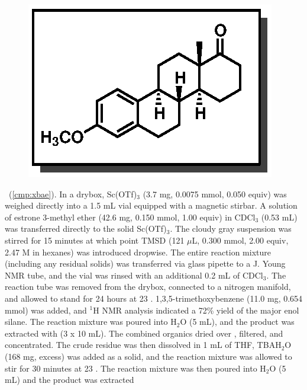 \vspace{10pt}
\begin{figure}
  \vspace{-28pt}
  \begin{center}
    \includegraphics[scale=0.8]{chp_singlecarbon/images/xbae}
  \end{center}
  \vspace{-30pt}
\end{figure}\noindent \textbf{\CMPxbae}\ (\ref{cmp:xbae}). In a drybox, Sc(OTf)$_3$ (3.7 mg,
0.0075 mmol, 0.050 equiv) was weighed directly into a 1.5 mL vial equipped with a magnetic stirbar.
A solution of estrone 3-methyl ether (42.6 mg, 0.150 mmol, 1.00 equiv) in CDCl$_3$ (0.53 mL) was
transferred directly to the solid Sc(OTf)$_3$. The cloudy gray suspension was stirred for 15 minutes
at which point TMSD (121 $\mu$L, 0.300 mmol, 2.00 equiv, 2.47 M in hexanes) was introduced dropwise.
The entire reaction mixture (including any residual solids) was transferred via glass pipette to a J. Young NMR tube,
and the vial was rinsed with an additional 0.2 mL of CDCl$_3$. The reaction tube was removed from
the drybox, connected to a nitrogen manifold, and allowed to stand for 24 hours at 23 \degc.
1,3,5-trimethoxybenzene (11.0 mg, 0.654 mmol) was added, and $^1$H NMR analysis indicated a
72\% yield of the major enol silane. The reaction mixture was poured into H$_2$O (5 mL), and the
product was extracted with  (3 x 10 mL). The combined organics dried over ,
filtered, and concentrated. The crude residue was then dissolved in 1 mL of THF, TBAH$_2$O
(168 mg, excess) was added as a solid, and the reaction mixture was allowed to stir for 30 minutes
at 23 \degc. The reaction mixture was then poured into H$_2$O (5 mL) and the product was extracted
